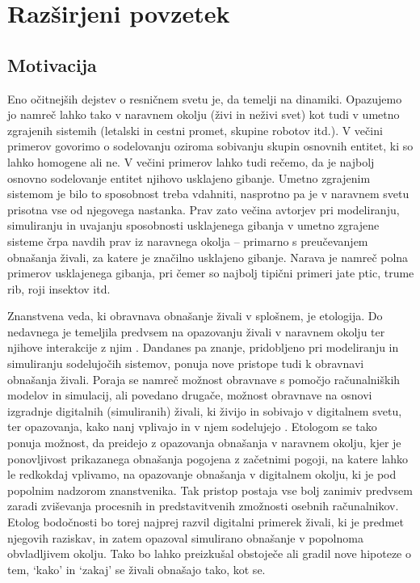 \graphicspath{{img/}}









\appendix
\makeatletter
 \if@slovene\else 
  \ifxetex{}\else{}\fi
 \fi
\makeatother
\chapter{Razširjeni povzetek}
\label{chap:a}


\section{Motivacija}
Eno očitnejših dejstev o resničnem svetu je, da temelji na dinamiki. Opazujemo jo namreč lahko tako v naravnem okolju (živi in neživi svet) kot tudi v umetno zgrajenih sistemih (letalski in cestni promet, skupine robotov itd.). V večini primerov govorimo o sodelovanju oziroma sobivanju skupin osnovnih entitet, ki so lahko homogene ali ne. V večini primerov lahko tudi rečemo, da je najbolj osnovno sodelovanje entitet njihovo usklajeno gibanje. Umetno zgrajenim sistemom je bilo to sposobnost treba vdahniti, nasprotno pa je v naravnem svetu prisotna vse od njegovega nastanka. Prav zato večina avtorjev \cite{bonabeau:1999, braitenberg:1984,jadbabaie:2003,mataric:1995} pri modeliranju, simuliranju in uvajanju sposobnosti usklajenega gibanja v umetno zgrajene sisteme črpa navdih prav iz naravnega okolja -- primarno s preučevanjem obnašanja živali, za katere je značilno usklajeno gibanje. Narava je namreč polna primerov usklajenega gibanja, pri čemer so najbolj tipični primeri jate ptic, trume rib, roji insektov itd.

Znanstvena veda, ki obravnava obnašanje živali v splošnem, je etologija. Do nedavnega je temeljila predvsem na opazovanju živali v naravnem okolju ter njihove interakcije z njim \cite{watts:1998}. Dandanes pa znanje, pridobljeno pri modeliranju in simuliranju sodelujočih sistemov, ponuja nove pristope tudi k obravnavi obnašanja živali. Poraja se namreč možnost obravnave s pomočjo računalniških modelov in simulacij, ali povedano drugače, možnost obravnave na osnovi izgradnje digitalnih (simuliranih) živali, ki živijo in sobivajo v digitalnem svetu, ter opazovanja, kako nanj vplivajo in v njem sodelujejo \cite{bentley:2002}. Etologom se tako ponuja možnost, da preidejo z opazovanja obnašanja v naravnem okolju, kjer je ponovljivost prikazanega obnašanja pogojena z začetnimi pogoji, na katere lahko le redkokdaj vplivamo, na opazovanje obnašanja v digitalnem okolju, ki je pod popolnim nadzorom znanstvenika. Tak pristop postaja vse bolj zanimiv predvsem zaradi zviševanja procesnih in predstavitvenih zmožnosti osebnih računalnikov. Etolog bodočnosti bo torej najprej razvil digitalni primerek živali, ki je predmet njegovih raziskav, in zatem opazoval simulirano obnašanje v popolnoma obvladljivem okolju. Tako bo lahko preizkušal obstoječe ali gradil nove hipoteze o tem, `kako' in `zakaj' se živali obnašajo tako, kot se.

